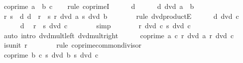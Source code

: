 \begin{isabellebody}
\ {\isachardoublequoteopen}coprime\ {\isacharparenleft}{\kern0pt}a\ {\isacharasterisk}{\kern0pt}\ b{\isacharparenright}{\kern0pt}\ c{\isachardoublequoteclose}\isanewline
\ \ \isamarkupfalse%
\ {\isacharparenleft}{\kern0pt}rule\ coprimeI{\isacharparenright}{\kern0pt}\isanewline
\ \ \ \ \isamarkupfalse%
\ d\isanewline
\ \ \ \ \isamarkupfalse%
\ {\isachardoublequoteopen}d\ dvd\ a\ {\isacharasterisk}{\kern0pt}\ b{\isachardoublequoteclose}\isanewline
\ \ \ \ \isamarkupfalse%
\ \isamarkupfalse%
\ r\ s\ \ d{\isacharcolon}{\kern0pt}\ {\isachardoublequoteopen}d\ {\isacharequal}{\kern0pt}\ r\ {\isacharasterisk}{\kern0pt}\ s{\isachardoublequoteclose}\ {\isachardoublequoteopen}r\ dvd\ a{\isachardoublequoteclose}\ {\isachardoublequoteopen}s\ dvd\ b{\isachardoublequoteclose}\isanewline
\ \ \ \ \ \ \isamarkupfalse%
\ {\isacharparenleft}{\kern0pt}rule\ dvd{\isacharunderscore}{\kern0pt}productE{\isacharparenright}{\kern0pt}\isanewline
\ \ \ \ \isamarkupfalse%
\ {\isachardoublequoteopen}d\ dvd\ c{\isachardoublequoteclose}\isanewline
\ \ \ \ \isamarkupfalse%
\ d\ \isamarkupfalse%
\ {\isachardoublequoteopen}r\ {\isacharasterisk}{\kern0pt}\ s\ dvd\ c{\isachardoublequoteclose}\isanewline
\ \ \ \ \ \ \isamarkupfalse%
\ simp\isanewline
\ \ \ \ \isamarkupfalse%
\ \isamarkupfalse%
\ {\isachardoublequoteopen}r\ dvd\ c{\isachardoublequoteclose}\ {\isachardoublequoteopen}s\ dvd\ c{\isachardoublequoteclose}\isanewline
\ \ \ \ \ \ \isamarkupfalse%
\ {\isacharparenleft}{\kern0pt}auto\ intro{\isacharcolon}{\kern0pt}\ dvd{\isacharunderscore}{\kern0pt}mult{\isacharunderscore}{\kern0pt}left\ dvd{\isacharunderscore}{\kern0pt}mult{\isacharunderscore}{\kern0pt}right{\isacharparenright}{\kern0pt}\isanewline
\ \ \ \ \isamarkupfalse%
\ {\isacartoucheopen}coprime\ a\ c{\isacartoucheclose}\ {\isacartoucheopen}r\ dvd\ a{\isacartoucheclose}\ {\isacartoucheopen}r\ dvd\ c{\isacartoucheclose}\isanewline
\ \ \ \ \isamarkupfalse%
\ {\isachardoublequoteopen}is{\isacharunderscore}{\kern0pt}unit\ r{\isachardoublequoteclose}\isanewline
\ \ \ \ \ \ \isamarkupfalse%
\ {\isacharparenleft}{\kern0pt}rule\ coprime{\isacharunderscore}{\kern0pt}common{\isacharunderscore}{\kern0pt}divisor{\isacharparenright}{\kern0pt}\isanewline
\ \ \ \ \isamarkupfalse%
\ \isamarkupfalse%
\ {\isacartoucheopen}coprime\ b\ c{\isacartoucheclose}\ {\isacartoucheopen}s\ dvd\ b{\isacartoucheclose}\ {\isacartoucheopen}s\ dvd\ c{\isacartoucheclose}\isanewline

\end{isabellebody}
